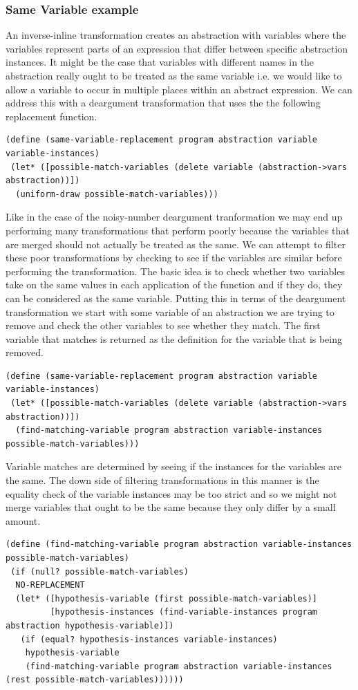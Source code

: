 \documentclass[a4paper,10pt]{article}
\begin{document}
\subsubsection{Same Variable example}
An inverse-inline transformation creates an abstraction with variables where the variables represent parts of an expression that differ between specific abstraction instances.  It might be the case that variables with different names in the abstraction really ought to be treated as the same variable i.e. we would like to allow a variable to occur in multiple places within an abstract expression.  We can address this with a deargument transformation that uses the the following replacement function.  
\begin{verbatim}
(define (same-variable-replacement program abstraction variable variable-instances)
 (let* ([possible-match-variables (delete variable (abstraction->vars abstraction))])
  (uniform-draw possible-match-variables)))
\end{verbatim}
Like in the case of the noisy-number deargument tranformation we may end up performing many transformations that perform poorly because the variables that are merged should not actually be treated as the same.  We can attempt to filter these poor transformations by checking to see if the variables are similar before performing the transformation.  The basic idea is to check whether two variables take on the same values in each application of the function and if they do, they can be considered as the same variable.  Putting this in terms of the deargument transformation we start with some variable of an abstraction we are trying to remove and check the other variables to see whether they match.  The first variable that matches is returned as the definition for the variable that is being removed.  
\begin{verbatim}
(define (same-variable-replacement program abstraction variable variable-instances)
 (let* ([possible-match-variables (delete variable (abstraction->vars abstraction))])
  (find-matching-variable program abstraction variable-instances possible-match-variables)))
\end{verbatim}
Variable matches are determined by seeing if the instances for the variables are the same.  The down side of filtering transformations in this manner is the equality check of the variable instances may be too strict and so we might not merge variables that ought to be the same because they only differ by a small amount.
\begin{verbatim}
(define (find-matching-variable program abstraction variable-instances possible-match-variables)
 (if (null? possible-match-variables)
  NO-REPLACEMENT
  (let* ([hypothesis-variable (first possible-match-variables)]
         [hypothesis-instances (find-variable-instances program abstraction hypothesis-variable)])
   (if (equal? hypothesis-instances variable-instances)
    hypothesis-variable
    (find-matching-variable program abstraction variable-instances (rest possible-match-variables))))))
\end{verbatim}
\end{document}

